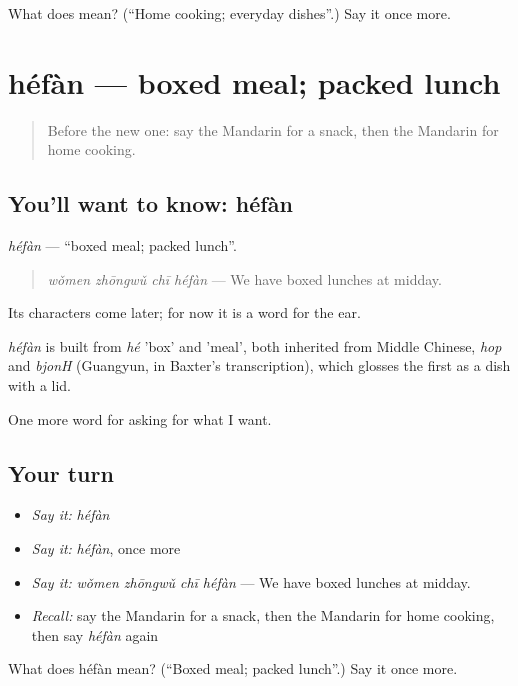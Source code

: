 \begin{tcolorbox}[breakable,colback=teal!4,colframe=teal!35!black,title={Before you move on}]
What does  mean? (\textquotedblleft{}Home cooking; everyday dishes\textquotedblright{}.) Say it once more.
\end{tcolorbox}
\section[héfàn]{héfàn — boxed meal; packed lunch}

\label{lesson:ZH-C182-hefan}



\begin{quote}
Before the new one: say the Mandarin for a snack, then the Mandarin for home cooking.
\end{quote}

\subsection*{You'll want to know: héfàn}
\emph{héfàn} — \textquotedblleft{}boxed meal; packed lunch\textquotedblright{}.

\begin{quote}
\emph{wǒmen zhōngwǔ chī héfàn} — We have boxed lunches at midday.
\end{quote}

Its characters come later; for now it is a word for the ear.

\begin{cousinweb}
\emph{héfàn} is built from \emph{hé} 'box' and  'meal', both inherited from Middle Chinese, \emph{hop} and \emph{bjonH} (Guangyun, in Baxter's transcription), which glosses the first as a dish with a lid.
\end{cousinweb}

\begin{grammarlens}[title={What you've built}]
One more word for asking for what I want.
\end{grammarlens}

\subsection*{Your turn}
\begin{itemize}
\raggedright
  \item \emph{Say it:} \emph{héfàn}
  \item \emph{Say it:} \emph{héfàn}, once more
  \item \emph{Say it:} \emph{wǒmen zhōngwǔ chī héfàn} — We have boxed lunches at midday.
  \item \emph{Recall:} say the Mandarin for a snack, then the Mandarin for home cooking, then say \emph{héfàn} again
\end{itemize}

\begin{tcolorbox}[breakable,colback=teal!4,colframe=teal!35!black,title={Before you move on}]
What does héfàn mean? (\textquotedblleft{}Boxed meal; packed lunch\textquotedblright{}.) Say it once more.
\end{tcolorbox}
